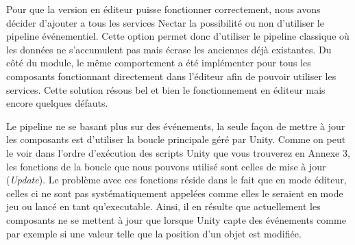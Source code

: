 Pour que la version en éditeur puisse fonctionner correctement, nous avons décider d'ajouter a tous les services Nectar la possibilité ou non d'utiliser le pipeline événementiel. Cette option permet donc d'utiliser le pipeline classique où les données ne s'accumulent pas mais écrase les anciennes déjà existantes. Du côté du module, le même comportement a été implémenter pour tous les composants fonctionnant directement dans l'éditeur afin de pouvoir utiliser les services. Cette solution résous bel et bien le fonctionnement en éditeur mais encore quelques défauts.

Le pipeline ne se basant plus sur des événements, la seule façon de mettre à jour les composants est d'utiliser la boucle principale géré par Unity. Comme on peut le voir dans l'ordre d'exécution des scripts Unity que vous trouverez en Annexe 3, les fonctions de la boucle que nous pouvons utilisé sont celles de mise à jour (\emph{Update}). Le problème avec ces fonctions réside dans le fait que en mode éditeur, celles ci ne sont pas systématiquement appelées comme elles le seraient en mode jeu ou lancé en tant qu'executable. Ainsi, il en résulte que actuellement les composants ne se mettent à jour que lorsque Unity capte des événements comme par exemple si une valeur telle que la position d'un objet est modifiée.